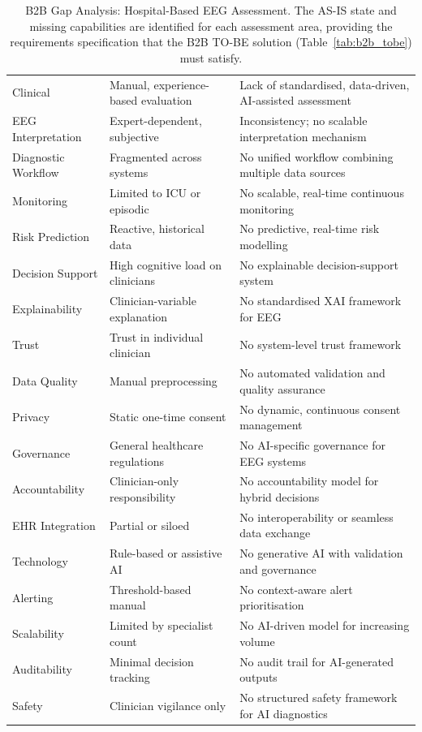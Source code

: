 {\tablestripes\tablefontsize
{}
\begin{xltabular}{\textwidth}{@{} >{\raggedright\arraybackslash}p{3.2cm} L L @{}}
\caption[B2B Gap Analysis: Hospital-Based EEG Assessment]{B2B Gap Analysis: Hospital-Based EEG Assessment. The AS-IS state and missing capabilities are identified for each assessment area, providing the requirements specification that the B2B TO-BE solution (Table~\ref{tab:b2b_tobe}) must satisfy.}\label{tab:b2b_gap} \\
\toprule
{} &  &  \\
\midrule
\endfirsthead
\endhead
\bottomrule
\endlastfoot
Clinical & Manual, experience-based evaluation & Lack of standardised, data-driven, AI-assisted assessment \\
\addlinespace
EEG Interpretation & Expert-dependent, subjective & Inconsistency; no scalable interpretation mechanism \\
\addlinespace
Diagnostic Workflow & Fragmented across systems & No unified workflow combining multiple data sources \\
\addlinespace
Monitoring & Limited to ICU or episodic & No scalable, real-time continuous monitoring \\
\addlinespace
Risk Prediction & Reactive, historical data & No predictive, real-time risk modelling \\
\addlinespace
Decision Support & High cognitive load on clinicians & No explainable decision-support system \\
\addlinespace
Explainability & Clinician-variable explanation & No standardised XAI framework for EEG \\
\addlinespace
Trust & Trust in individual clinician & No system-level trust framework \\
\addlinespace
Data Quality & Manual preprocessing & No automated validation and quality assurance \\
\addlinespace
Privacy & Static one-time consent & No dynamic, continuous consent management \\
\addlinespace
Governance & General healthcare regulations & No AI-specific governance for EEG systems \\
\addlinespace
Accountability & Clinician-only responsibility & No accountability model for hybrid decisions \\
\addlinespace
EHR Integration & Partial or siloed & No interoperability or seamless data exchange \\
\addlinespace
Technology & Rule-based or assistive AI & No generative AI with validation and governance \\
\addlinespace
Alerting & Threshold-based manual & No context-aware alert prioritisation \\
\addlinespace
Scalability & Limited by specialist count & No AI-driven model for increasing volume \\
\addlinespace
Auditability & Minimal decision tracking & No audit trail for AI-generated outputs \\
\addlinespace
Safety & Clinician vigilance only & No structured safety framework for AI diagnostics \\
\end{xltabular}}
